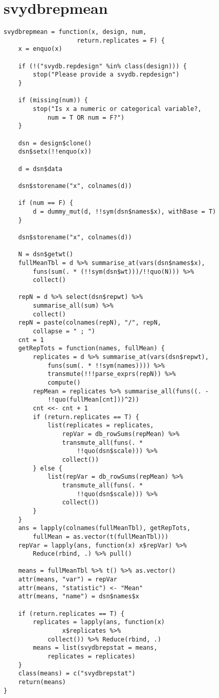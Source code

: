 \section{svydbrepmean}

\begin{lstlisting}
svydbrepmean = function(x, design, num, 
                    return.replicates = F) {
    x = enquo(x)
    
    if (!("svydb.repdesign" %in% class(design))) {
        stop("Please provide a svydb.repdesign")
    }
    
    if (missing(num)) {
        stop("Is x a numeric or categorical variable?, 
            num = T OR num = F?")
    }
    
    dsn = design$clone()
    dsn$setx(!!enquo(x))
    
    d = dsn$data
    
    dsn$storename("x", colnames(d))
    
    if (num == F) {
        d = dummy_mut(d, !!sym(dsn$names$x), withBase = T)
    }
    
    dsn$storename("x", colnames(d))
    
    N = dsn$getwt()
    fullMeanTbl = d %>% summarise_at(vars(dsn$names$x), 
        funs(sum(. * (!!sym(dsn$wt)))/!!quo(N))) %>% 
        collect()
    
    repN = d %>% select(dsn$repwt) %>% 
        summarise_all(sum) %>% 
        collect()
    repN = paste(colnames(repN), "/", repN, 
        collapse = " ; ")
    cnt = 1
    getRepTots = function(names, fullMean) {
        replicates = d %>% summarise_at(vars(dsn$repwt), 
            funs(sum(. * !!sym(names)))) %>% 
            transmute(!!!parse_exprs(repN)) %>% 
            compute()
        repMean = replicates %>% summarise_all(funs((. - 
            !!quo(fullMean[cnt]))^2))
        cnt <<- cnt + 1
        if (return.replicates == T) {
            list(replicates = replicates, 
                repVar = db_rowSums(repMean) %>% 
                transmute_all(funs(. * 
                    !!quo(dsn$scale))) %>% 
                collect())
        } else {
            list(repVar = db_rowSums(repMean) %>% 
                transmute_all(funs(. * 
                    !!quo(dsn$scale))) %>% 
                collect())
        }
    }
    ans = lapply(colnames(fullMeanTbl), getRepTots, 
        fullMean = as.vector(t(fullMeanTbl)))
    repVar = lapply(ans, function(x) x$repVar) %>% 
        Reduce(rbind, .) %>% pull()
    
    means = fullMeanTbl %>% t() %>% as.vector()
    attr(means, "var") = repVar
    attr(means, "statistic") <- "Mean"
    attr(means, "name") = dsn$names$x
    
    if (return.replicates == T) {
        replicates = lapply(ans, function(x) 
                x$replicates %>% 
            collect()) %>% Reduce(rbind, .)
        means = list(svydbrepstat = means, 
            replicates = replicates)
    }
    class(means) = c("svydbrepstat")
    return(means)
}
\end{lstlisting}


